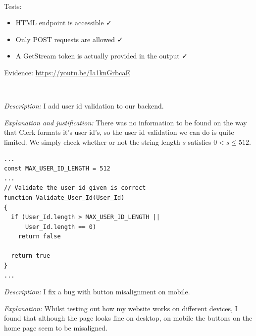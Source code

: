 {\color{gray} \hrulefill} \\ \vspace{0.2cm}
{\sffamily Tests:}

\begin{itemize}
  \item HTML endpoint is accessible \faCheck \\
  \item Only POST requests are allowed \faCheck \\
  \item A GetStream token is actually provided in the output \faCheck
\end{itemize}

{\sffamily Evidence: \url{https://youtu.be/Ia1knGrbcaE}}

{\color{gray} \hrulefill}
\\ \vspace{0.2cm}

\textit{Description:} I add user id validation to our backend.
\\ \vspace{0.2cm}

\textit{Explanation and justification:} There was no information
to be found on the way that Clerk formats it's user id's, so the 
user id validation we can do is quite limited. We simply check 
whether or not the string length $s$ satisfies $0 < s \leq 512$.
\\ \vspace{0.2cm}

\begin{verbatim}
...
const MAX_USER_ID_LENGTH = 512
...
// Validate the user id given is correct
function Validate_User_Id(User_Id)
{
  if (User_Id.length > MAX_USER_ID_LENGTH ||
      User_Id.length == 0)
    return false

  return true
}
...
\end{verbatim}

\textit{Description:} I fix a bug with button misalignment on 
mobile. \\ \vspace{0.2cm}

\textit{Explanation:} Whilst testing out how my website works
on different devices, I found that although the page looks 
fine on desktop, on mobile the buttons on the home page seem
to be misaligned. \\


